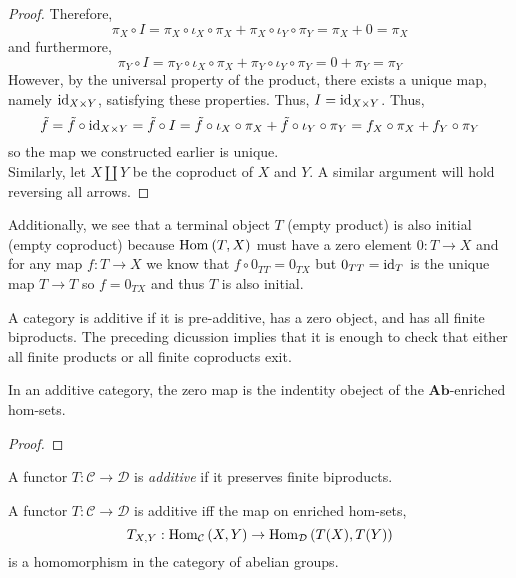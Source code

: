 \documentclass[12pt]{article}
\newcommand{\C}{\mathcal{C}}
\newcommand{\D}{\mathcal{D}}
\newcommand{\Ab}{\mathbf{Ab}}
\begin{document}
\begin{proof}
Therefore, 
\[ \pi_X \circ I = \pi_X \circ \iota_X \circ \pi_X + \pi_X \circ \iota_Y \circ \pi_Y = \pi_X + 0 = \pi_X \]
and furthermore,
\[ \pi_Y \circ I = \pi_Y \circ \iota_X \circ \pi_X + \pi_Y \circ \iota_Y \circ \pi_Y = 0 + \pi_Y = \pi_Y \]
However, by the universal property of the product, there exists a unique map, namely $\mathrm{id}_{X \times Y}$, satisfying these properties. Thus, $I = \mathrm{id}_{X \times Y}$. Thus,
\[ \tilde{f} = \tilde{f} \circ \mathrm{id}_{X \times Y} = \tilde{f} \circ I = \tilde{f} \circ \iota_X \circ \pi_X + \tilde{f} \circ \iota_Y \circ \pi_Y  = f_X \circ \pi_X + f_Y \circ \pi_Y \]
so the map we constructed earlier is unique. 
\bigskip\\
Similarly, let $X \coprod Y$ be the coproduct of $X$ and $Y$. A similar argument will hold reversing all arrows. 
\end{proof}

\begin{rmk}
Additionally, we see that a terminal object $T$ (empty product) is also initial (empty coproduct) because $\mathrm{Hom}_{} \left( T, X \right)$ must have a zero element $0 : T \to X$ and for any map $f : T \to X$ we know that $f \circ 0_{TT} = 0_{TX}$ but $0_{TT} = \mathrm{id}_T$ is the unique map $T \to T$ so $f = 0_{TX}$ and thus $T$ is also initial. 
\end{rmk}


\begin{definition}
A category is additive if it is pre-additive, has a zero object, and has all finite biproducts. The preceding dicussion implies that it is enough to check that either all finite products or all finite coproducts exit.  
\end{definition}

\begin{proposition}
In an additive category, the zero map is the indentity obeject of the $\Ab$-enriched hom-sets.
\end{proposition}

\begin{proof}

\end{proof}

\begin{definition}
A functor $T : \C \to \D$ is \textit{additive} if it preserves finite biproducts.  
\end{definition}

\begin{proposition}
A functor $T : \C \to \D$ is additive iff the map on enriched hom-sets,
\[ T_{X,Y} : \Hom{\C}{X}{Y} \to \Hom{\D}{T(X)}{T(Y)} \]
is a homomorphism in the category of abelian groups.
\end{proposition}
\end{document}
